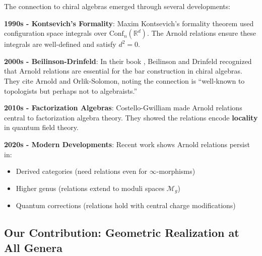 \begin{historical}
The connection to chiral algebras emerged through several developments:

\textbf{1990s - Kontsevich's Formality}:
Maxim Kontsevich's formality theorem \cite{Kontsevich97} used configuration space integrals 
over $\text{Conf}_n(\mathbb{R}^d)$. The Arnold relations ensure these integrals are 
well-defined and satisfy $d^2 = 0$.

\textbf{2000s - Beilinson-Drinfeld}:
In their book \cite{BD04}, Beilinson and Drinfeld recognized that Arnold relations are 
essential for the bar construction in chiral algebras. They cite Arnold and Orlik-Solomon, 
noting the connection is ``well-known to topologists but perhaps not to algebraists.''

\textbf{2010s - Factorization Algebras}:
Costello-Gwilliam \cite{CG17} made Arnold relations central to factorization algebra theory. 
They showed the relations encode \textbf{locality} in quantum field theory.

\textbf{2020s - Modern Developments}:
Recent work \cite{GLZ22, FG-factorization} shows Arnold relations persist in:
\begin{itemize}
\item Derived categories (need relations even for $\infty$-morphisms)
\item Higher genus (relations extend to moduli spaces $\mathcal{M}_g$)
\item Quantum corrections (relations hold with central charge modifications)
\end{itemize}
\end{historical}

\subsection{Our Contribution: Geometric Realization at All Genera}

